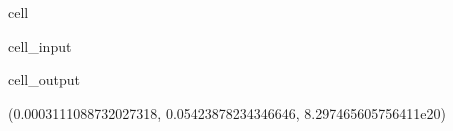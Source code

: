 \documentclass[letterpaper,10pt,english]{jupyterBook}
\begin{document}
\begin{sphinxuseclass}{cell}\begin{sphinxVerbatimInput}

\begin{sphinxuseclass}{cell_input}
\begin{sphinxVerbatim}[commandchars=\\\{\}]
      \PYG{p}{[}\PYG{p}{]}
     \PYG{p}{[}\PYG{p}{]}

     
\end{sphinxVerbatim}

\end{sphinxuseclass}\end{sphinxVerbatimInput}
\begin{sphinxVerbatimOutput}

\begin{sphinxuseclass}{cell_output}
\begin{sphinxVerbatim}[commandchars=\\\{\}]
(0.0003111088732027318, 0.05423878234346646, 8.297465605756411e\PYGZhy{}20)
\end{sphinxVerbatim}

\end{sphinxuseclass}\end{sphinxVerbatimOutput}

\end{sphinxuseclass}
\end{document}
